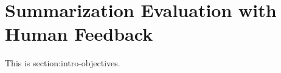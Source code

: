 \section{Summarization Evaluation with Human Feedback}
\label{section:method-evaluation}

This is section:intro-objectives.